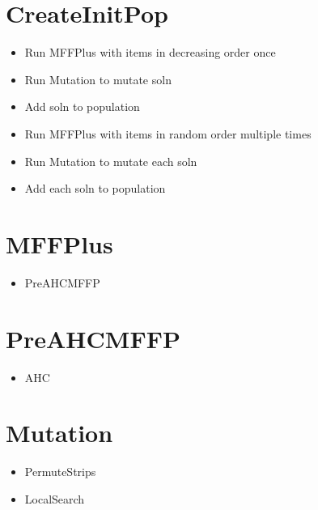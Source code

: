 \documentclass{elsarticle}
\begin{document}
\section{CreateInitPop}
\begin{itemize}
	\item Run MFFPlus with items in decreasing order once
	\item Run Mutation to mutate soln
	\item Add soln to population
	\item Run MFFPlus with items in random order multiple times
	\item Run Mutation to mutate each soln
	\item Add each soln to population
\end{itemize}

\section{MFFPlus}
\begin{itemize}
	\item PreAHCMFFP
\end{itemize}

\section{PreAHCMFFP}
\begin{itemize}
	\item AHC
\end{itemize}

\section{Mutation}
\begin{itemize}
	\item PermuteStrips
	\item LocalSearch
\end{itemize}
\end{document}
